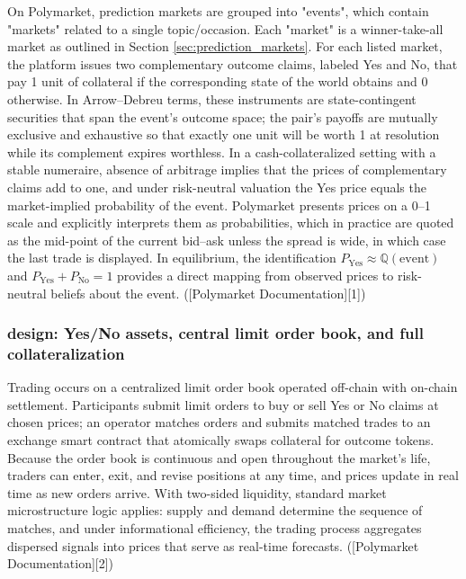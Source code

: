On Polymarket, prediction markets are grouped into "events", which contain "markets" related to a single topic/occasion. 
Each "market" is a winner-take-all market as outlined in Section \ref{sec:prediction_markets}. For each listed market, the platform issues two complementary outcome claims, labeled Yes and No, that pay 1 unit of collateral if the corresponding state of the world obtains and 0 otherwise. In Arrow–Debreu terms, these instruments are state-contingent securities that span the event’s outcome space; the pair’s payoffs are mutually exclusive and exhaustive so that exactly one unit will be worth 1 at resolution while its complement expires worthless. In a cash-collateralized setting with a stable numeraire, absence of arbitrage implies that the prices of complementary claims add to one, and under risk-neutral valuation the Yes price equals the market-implied probability of the event. Polymarket presents prices on a 0–1 scale and explicitly interprets them as probabilities, which in practice are quoted as the mid-point of the current bid–ask unless the spread is wide, in which case the last trade is displayed. In equilibrium, the identification $P_{\text{Yes}} \approx \mathbb{Q}(\text{event})$ and $P_{\text{Yes}} + P_{\text{No}} = 1$ provides a direct mapping from observed prices to risk-neutral beliefs about the event. ([Polymarket Documentation][1])







\subsubsection{design: Yes/No assets, central limit order book, and full collateralization}

Trading occurs on a centralized limit order book operated off-chain with on-chain settlement. Participants submit limit orders to buy or sell Yes or No claims at chosen prices; an operator matches orders and submits matched trades to an exchange smart contract that atomically swaps collateral for outcome tokens. Because the order book is continuous and open throughout the market’s life, traders can enter, exit, and revise positions at any time, and prices update in real time as new orders arrive. With two-sided liquidity, standard market microstructure logic applies: supply and demand determine the sequence of matches, and under informational efficiency, the trading process aggregates dispersed signals into prices that serve as real-time forecasts. ([Polymarket Documentation][2])

